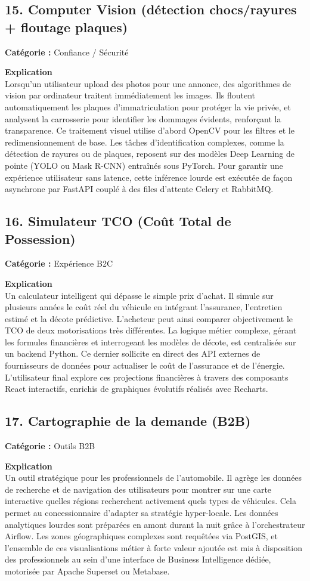 \documentclass[11pt,a4paper]{article}
\begin{document}
\subsection{15. Computer Vision (détection chocs/rayures + floutage plaques)}
\textbf{Catégorie :} Confiance / Sécurité

\textbf{Explication}\\
Lorsqu'un utilisateur upload des photos pour une annonce, des algorithmes de vision par ordinateur traitent immédiatement les images. Ils floutent automatiquement les plaques d'immatriculation pour protéger la vie privée, et analysent la carrosserie pour identifier les dommages évidents, renforçant la transparence. Ce traitement visuel utilise d'abord OpenCV pour les filtres et le redimensionnement de base. Les tâches d'identification complexes, comme la détection de rayures ou de plaques, reposent sur des modèles Deep Learning de pointe (YOLO ou Mask R-CNN) entraînés sous PyTorch. Pour garantir une expérience utilisateur sans latence, cette inférence lourde est exécutée de façon asynchrone par FastAPI couplé à des files d'attente Celery et RabbitMQ.

\subsection{16. Simulateur TCO (Coût Total de Possession)}
\textbf{Catégorie :} Expérience B2C

\textbf{Explication}\\
Un calculateur intelligent qui dépasse le simple prix d'achat. Il simule sur plusieurs années le coût réel du véhicule en intégrant l'assurance, l'entretien estimé et la décote prédictive. L'acheteur peut ainsi comparer objectivement le TCO de deux motorisations très différentes. La logique métier complexe, gérant les formules financières et interrogeant les modèles de décote, est centralisée sur un backend Python. Ce dernier sollicite en direct des API externes de fournisseurs de données pour actualiser le coût de l'assurance et de l'énergie. L'utilisateur final explore ces projections financières à travers des composants React interactifs, enrichis de graphiques évolutifs réalisés avec Recharts.

\subsection{17. Cartographie de la demande (B2B)}
\textbf{Catégorie :} Outils B2B

\textbf{Explication}\\
Un outil stratégique pour les professionnels de l'automobile. Il agrège les données de recherche et de navigation des utilisateurs pour montrer sur une carte interactive quelles régions recherchent activement quels types de véhicules. Cela permet au concessionnaire d'adapter sa stratégie hyper-locale. Les données analytiques lourdes sont préparées en amont durant la nuit grâce à l'orchestrateur Airflow. Les zones géographiques complexes sont requêtées via PostGIS, et l'ensemble de ces visualisations métier à forte valeur ajoutée est mis à disposition des professionnels au sein d'une interface de Business Intelligence dédiée, motorisée par Apache Superset ou Metabase.
\end{document}
